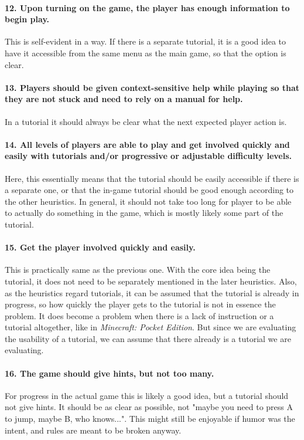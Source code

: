 \paragraph{12. Upon turning on the game, the player has enough information to begin play.} This is self-evident in a way. If there is a separate tutorial, it is a good idea to have it accessible from the same menu as the main game, so that the option is clear.

\paragraph{13. Players should be given context-sensitive help while playing so that they are not stuck and need to rely on a manual for help.} 
In a tutorial it should always be clear what the next expected player action is.

\paragraph{14. All levels of players are able to play and get involved quickly and easily with tutorials and/or progressive or adjustable difficulty levels. }
Here, this essentially means that the tutorial should be easily accessible if there is a separate one, or that the in-game tutorial should be good enough according to the other heuristics. In general, it should not take too long for player to be able to actually do something in the game, which is mostly likely some part of the tutorial.
 
\paragraph{15. Get the player involved quickly and easily.}
This is practically same as the previous one. With the core idea being the tutorial, it does not need to be separately mentioned in the later heuristics. Also, as the heuristics regard tutorials, it can be assumed that the tutorial is already in progress, so how quickly the player gets to the tutorial is not in essence the problem. It does become a problem when there is a lack of instruction or a tutorial altogether, like in \textit{Minecraft: Pocket Edition}. But since we are evaluating the usability of a tutorial, we can assume that there already is a tutorial we are evaluating.

\paragraph{16. The game should give hints,  but not too many.} For progress in the actual game this is likely a good idea, but a tutorial should not give hints. It should be as clear as possible, not "maybe you need to press A to jump, maybe B, who knows...". This might still be enjoyable if humor was the intent, and rules are meant to be broken anyway.


